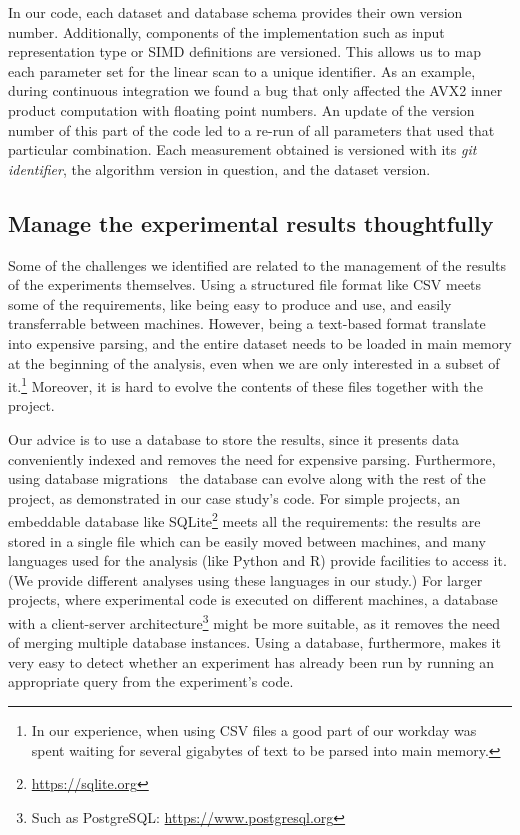 \documentclass{llncs}
\newcommand{\matodo}[1]{\todo[inline, color=green!50]{#1}}
\begin{document}
In our code, each dataset and database schema provides their own version number. Additionally, components of the implementation such as input representation type or SIMD definitions are versioned. This allows us to map each parameter set for the linear scan to a unique identifier. As an example, during continuous integration we found a bug that only affected the AVX2 inner product computation with floating point numbers. An update of the version number of this part of the code led to a re-run of all parameters that used that particular combination. Each measurement obtained is versioned with its \emph{git identifier}, the algorithm version in question, and the dataset version. 
\matodo{Downside: Manual work that might be error-prone.}

\subsection{Manage the experimental results thoughtfully}
\label{sec:manage-experiments}

Some of the challenges we identified are related to the management of the results
of the experiments themselves.
Using a structured file format like CSV meets some of the requirements, like being
easy to produce and use, and easily transferrable between machines.
However, being a text-based format translate into expensive parsing, and
the entire dataset needs to be loaded in main memory at the beginning
of the analysis, even when we are only interested in a subset of it.\footnote{
  In our experience, when using CSV files a good part of our workday was spent 
  waiting for several gigabytes of text to be parsed into main memory.
}
Moreover, it is hard to evolve the contents of these files together with 
the project.

Our advice is to use a database to store the results, since it presents data 
conveniently indexed and removes the need for expensive parsing. Furthermore,
using database migrations~\cite{citation-needed} the database can evolve along with
the rest of the project, as demonstrated in our case study's code.
For simple projects, an embeddable database like SQLite\footnote{\url{https://sqlite.org}}
meets all the requirements: the results are stored in a single file which can be easily moved
between machines, and many languages used for the analysis (like Python and R) provide
facilities to access it. (We provide different analyses using these languages in our study.)
For larger projects, where experimental code is executed on different machines, a database with
a client-server architecture\footnote{Such as PostgreSQL: \url{https://www.postgresql.org}} 
might be more suitable, as it removes the need of 
merging multiple database instances.
Using a database, furthermore, makes it very easy to detect whether 
an experiment has already been run by running an appropriate query from the experiment's code.
\end{document}
